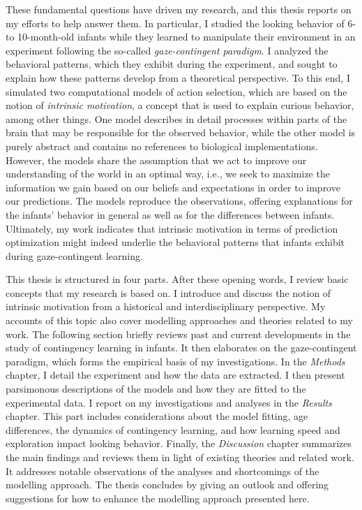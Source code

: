 \documentclass[a4paper]{scrreprt}
\begin{document}
These fundamental questions have driven my research, and this thesis reports on my efforts to help answer them. In particular, I studied the looking behavior of 6- to 10-month-old infants while they learned to manipulate their environment in an experiment following the so-called \textit{gaze-contingent paradigm}. I analyzed the behavioral patterns, which they exhibit during the experiment, and sought to explain how these patterns develop from a theoretical perspective. To this end, I simulated two computational models of action selection, which are based on the notion of \textit{intrinsic motivation}, a concept that is used to explain curious behavior, among other things. One model describes in detail processes within parts of the brain that may be responsible for the observed behavior, while the other model is purely abstract and contains no references to biological implementations. However, the models share the assumption that we act to improve our understanding of the world in an optimal way, i.e., we seek to maximize the information we gain based on our beliefs and expectations in order to improve our predictions. The models reproduce the observations, offering explanations for the infants' behavior in general as well as for the differences between infants. Ultimately, my work indicates that intrinsic motivation in terms of prediction optimization might indeed underlie the behavioral patterns that infants exhibit during gaze-contingent learning.

This thesis is structured in four parts. After these opening words, I review basic concepts that my research is based on. I introduce and discuss the notion of intrinsic motivation from a historical and interdisciplinary perspective. My accounts of this topic also cover modelling approaches and theories related to my work. The following section briefly reviews past and current developments in the study of contingency learning in infants. It then elaborates on the gaze-contingent paradigm, which forms the empirical basis of my investigations.
In the \textit{Methods} chapter, I detail the experiment and how the data are extracted. I then present parsimonous descriptions of the models and how they are fitted to the experimental data.
I report on my investigations and analyses in the \textit{Results} chapter. This part includes considerations about the model fitting, age differences, the dynamics of contingency learning, and how learning speed and exploration impact looking behavior.
Finally, the \textit{Discussion} chapter summarizes the main findings and reviews them in light of existing theories and related work. It addresses notable observations of the analyses and shortcomings of the modelling approach. The thesis concludes by giving an outlook and offering suggestions for how to enhance the modelling approach presented here.
\end{document}
